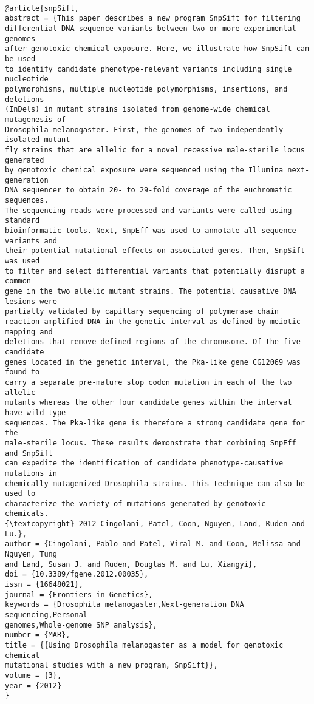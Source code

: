 \documentclass[]{article}
\begin{document}
\begin{verbatim}

@article{snpSift,
abstract = {This paper describes a new program SnpSift for filtering
differential DNA sequence variants between two or more experimental genomes
after genotoxic chemical exposure. Here, we illustrate how SnpSift can be used
to identify candidate phenotype-relevant variants including single nucleotide
polymorphisms, multiple nucleotide polymorphisms, insertions, and deletions
(InDels) in mutant strains isolated from genome-wide chemical mutagenesis of
Drosophila melanogaster. First, the genomes of two independently isolated mutant
fly strains that are allelic for a novel recessive male-sterile locus generated
by genotoxic chemical exposure were sequenced using the Illumina next-generation
DNA sequencer to obtain 20- to 29-fold coverage of the euchromatic sequences.
The sequencing reads were processed and variants were called using standard
bioinformatic tools. Next, SnpEff was used to annotate all sequence variants and
their potential mutational effects on associated genes. Then, SnpSift was used
to filter and select differential variants that potentially disrupt a common
gene in the two allelic mutant strains. The potential causative DNA lesions were
partially validated by capillary sequencing of polymerase chain
reaction-amplified DNA in the genetic interval as defined by meiotic mapping and
deletions that remove defined regions of the chromosome. Of the five candidate
genes located in the genetic interval, the Pka-like gene CG12069 was found to
carry a separate pre-mature stop codon mutation in each of the two allelic
mutants whereas the other four candidate genes within the interval have wild-type
sequences. The Pka-like gene is therefore a strong candidate gene for the
male-sterile locus. These results demonstrate that combining SnpEff and SnpSift
can expedite the identification of candidate phenotype-causative mutations in
chemically mutagenized Drosophila strains. This technique can also be used to
characterize the variety of mutations generated by genotoxic chemicals.
{\textcopyright} 2012 Cingolani, Patel, Coon, Nguyen, Land, Ruden and Lu.},
author = {Cingolani, Pablo and Patel, Viral M. and Coon, Melissa and Nguyen, Tung
and Land, Susan J. and Ruden, Douglas M. and Lu, Xiangyi},
doi = {10.3389/fgene.2012.00035},
issn = {16648021},
journal = {Frontiers in Genetics},
keywords = {Drosophila melanogaster,Next-generation DNA sequencing,Personal
genomes,Whole-genome SNP analysis},
number = {MAR},
title = {{Using Drosophila melanogaster as a model for genotoxic chemical
mutational studies with a new program, SnpSift}},
volume = {3},
year = {2012}
}
\end{verbatim}
\end{document}
